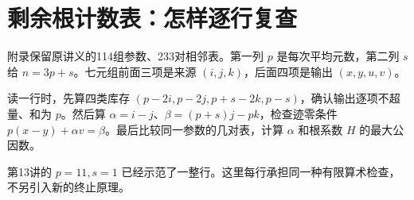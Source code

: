 \chapter{剩余根计数表：怎样逐行复查}\label{app:certificates}
附录保留原讲义的114组参数、233对相邻表。第一列 $p$ 是每次平均元数，第二列 $s$ 给 $n=3p+s$。七元组前面三项是来源 $(i,j,k)$，后面四项是输出 $(x,y,u,v)$。

读一行时，先算四类库存 $(p-2i,p-2j,p+s-2k,p-s)$，确认输出逐项不超量、和为 $p$。然后算 $\alpha=i-j$、$\beta=(p+s)j-pk$，检查迹零条件 $p(x-y)+\alpha v=\beta$。最后比较同一参数的几对表，计算 $\alpha$ 和根系数 $H$ 的最大公因数。

第13讲的 $p=11,s=1$ 已经示范了一整行。这里每行承担同一种有限算术检查，不另引入新的终止原理。
